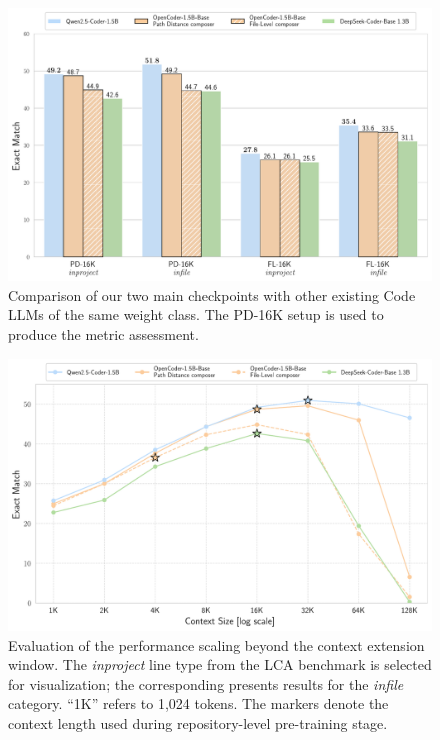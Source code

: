 \begin{figure}[ht]
    \centering
    \includegraphics[width=\textwidth]{figures/model-comparison.pdf}
    \caption{Comparison of our two main checkpoints with other existing Code LLMs of the same weight class. The PD-16K setup is used to produce the metric assessment.}\label{fig:model-comparison}
\end{figure}

\begin{figure}[ht]
    \centering
    \includegraphics[width=\textwidth]{figures/beyond-training-window-inproject.pdf}
    \caption{Evaluation of the performance 
    scaling beyond the context extension 
    window. The \textit{inproject} line type from the LCA benchmark is selected for visualization; the corresponding  presents results for the \textit{infile} category. ``1K'' refers to 1,024 tokens. The \raisebox{-0.3ex}{\FiveStarOpen} markers denote the context length used during repository-level pre-training stage.}\label{fig:beyond-training-window-inproject}
\end{figure}  %

